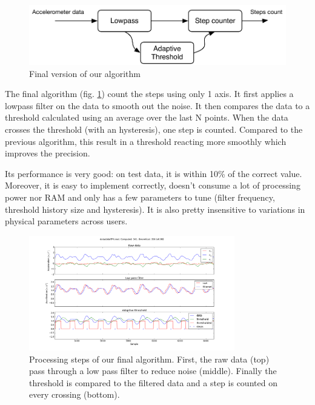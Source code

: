 \documentclass[12pt,twoside,a4paper]{article}
\begin{document}
\begin{figure}[h]
    \centering
    \includegraphics{algorithm}
    \caption{Final version of our algorithm}
    \label{fig:algorithm}
\end{figure}

The final algorithm (fig. \ref{fig:algorithm}) count the steps using only 1 axis.
It first applies a lowpass filter on the data to smooth out the noise.
It then compares the data to a threshold calculated using an average over the last N points.
When the data crosses the threshold (with an hysteresis), one step is counted.
Compared to the previous algorithm, this result in a threshold reacting more smoothly which improves the precision.

Its performance is very good: on test data, it is within 10\% of the correct value.
Moreover, it is easy to implement correctly, doesn't consume a lot of processing power nor RAM and only has a few parameters to tune (filter frequency, threshold history size and hysteresis).
It is also pretty insensitive to variations in physical parameters across users.

\begin{figure}[h]
    \centering
    \includegraphics[width=0.8\textwidth]{algorithm_steps}
    \caption{Processing steps of our final algorithm.
        First, the raw data (top) pass through a low pass filter to reduce noise (middle).
        Finally the threshold is compared to the filtered data and a step is counted on every crossing (bottom).
    }
    \label{fig:steps}
\end{figure}
\end{document}
